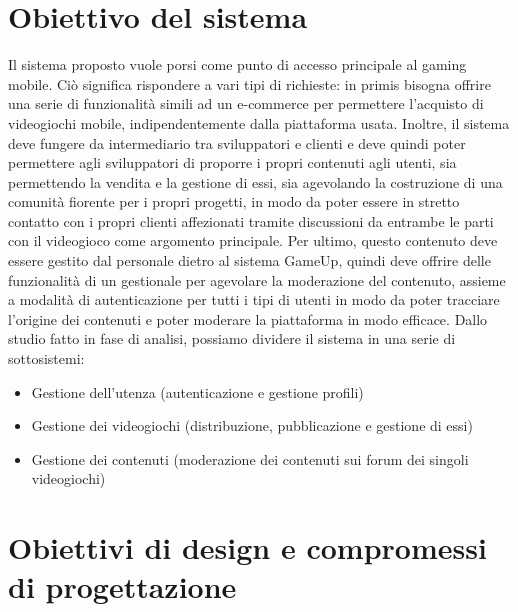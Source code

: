 \section{Obiettivo del sistema}
Il sistema proposto vuole porsi come punto di accesso principale al gaming mobile. Ciò significa rispondere a vari tipi di richieste: in primis bisogna offrire una serie di funzionalità simili ad un e-commerce per permettere l’acquisto di videogiochi mobile, indipendentemente dalla piattaforma usata. Inoltre, il sistema deve fungere da intermediario tra sviluppatori e clienti e deve quindi poter permettere agli sviluppatori di proporre i propri contenuti agli utenti, sia permettendo la vendita e la gestione di essi, sia agevolando la costruzione di una comunità fiorente per i propri progetti, in modo da poter essere in stretto contatto con i propri clienti affezionati tramite discussioni da entrambe le parti con il videogioco come argomento principale. Per ultimo, questo contenuto deve essere gestito dal personale dietro al sistema GameUp, quindi deve offrire delle funzionalità di un gestionale per agevolare la moderazione del contenuto, assieme a modalità di autenticazione per tutti i tipi di utenti in modo da poter tracciare l’origine dei contenuti e poter moderare la piattaforma in modo efficace.
Dallo studio fatto in fase di analisi, possiamo dividere il sistema in una serie di sottosistemi:
\begin{itemize}
	\item Gestione dell’utenza (autenticazione e gestione profili)
	\item Gestione dei videogiochi (distribuzione, pubblicazione e gestione di essi)
	\item Gestione dei contenuti (moderazione dei contenuti sui forum dei singoli videogiochi)
\end{itemize}

\section{Obiettivi di design e compromessi di progettazione}
